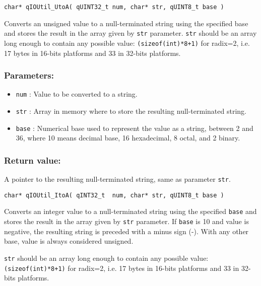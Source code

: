\noindent\hrulefill

\begin{lstlisting}[style=CStyle]
char* qIOUtil_UtoA( qUINT32_t num, char* str, qUINT8_t base )
\end{lstlisting}

Converts an unsigned value to a null-terminated string using the specified base and stores the result in the array given by \lstinline{str} parameter. \lstinline{str} should be an array long enough to contain any possible value: \lstinline{(sizeof(int)*8+1)} for radix=2, i.e. 17 bytes in 16-bits platforms and 33 in 32-bits platforms. 

\subsubsection*{Parameters:}
\begin{itemize}
    \item \lstinline{num} : Value to be converted to a string.
    \item \lstinline{str} : Array in memory where to store the resulting null-terminated string.
    \item \lstinline{base} : Numerical base used to represent the value as a string, between 2 and 36, where 10 means decimal base, 16 hexadecimal, 8 octal, and 2 binary.
\end{itemize}

\subsubsection*{Return value:}
A pointer to the resulting null-terminated string, same as parameter \lstinline{str}.


\noindent\hrulefill

\begin{lstlisting}[style=CStyle]
char* qIOUtil_ItoA( qINT32_t  num, char* str, qUINT8_t base )
\end{lstlisting}

Converts an integer value to a null-terminated string using the specified \lstinline{base} and stores the result in the array given by \lstinline{str} parameter. If \lstinline{base} is 10 and value is negative, the resulting string is preceded with a minus sign (-). With any other base, value is always considered unsigned. 

\lstinline{str} should be an array long enough to contain any possible value: \lstinline{(sizeof(int)*8+1)} for radix=2, i.e. 17 bytes in 16-bits platforms and 33 in 32-bits platforms.

